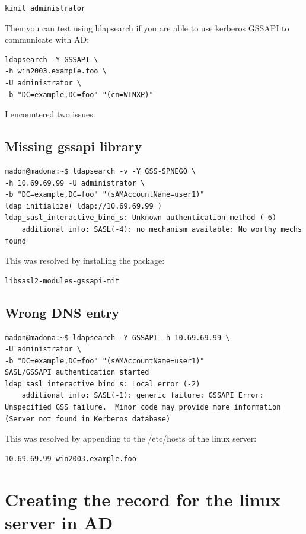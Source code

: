 \documentclass[12pt,a4]{article}
\begin{document}
\begin{verbatim}
kinit administrator
\end{verbatim}

Then you can test using ldapsearch if you are able to use kerberos GSSAPI to communicate with AD:
\begin{verbatim}
ldapsearch -Y GSSAPI \
-h win2003.example.foo \
-U administrator \
-b "DC=example,DC=foo" "(cn=WINXP)"
\end{verbatim}

I encountered two issues:

\subsection{Missing gssapi library}
\begin{verbatim}
madon@madona:~$ ldapsearch -v -Y GSS-SPNEGO \
-h 10.69.69.99 -U administrator \
-b "DC=example,DC=foo" "(sAMAccountName=user1)"
ldap_initialize( ldap://10.69.69.99 )
ldap_sasl_interactive_bind_s: Unknown authentication method (-6)
	additional info: SASL(-4): no mechanism available: No worthy mechs found
\end{verbatim}

This was resolved by installing the package:

\begin{verbatim}
libsasl2-modules-gssapi-mit
\end{verbatim}
\subsection{Wrong DNS entry}

\begin{verbatim}
madon@madona:~$ ldapsearch -Y GSSAPI -h 10.69.69.99 \
-U administrator \
-b "DC=example,DC=foo" "(sAMAccountName=user1)"
SASL/GSSAPI authentication started
ldap_sasl_interactive_bind_s: Local error (-2)
	additional info: SASL(-1): generic failure: GSSAPI Error: Unspecified GSS failure.  Minor code may provide more information (Server not found in Kerberos database)
\end{verbatim}

This was resolved by appending to the /etc/hosts of the linux server:

\begin{verbatim}
10.69.69.99 win2003.example.foo 
\end{verbatim}


\section{Creating the record for the linux server in AD}
\end{document}
